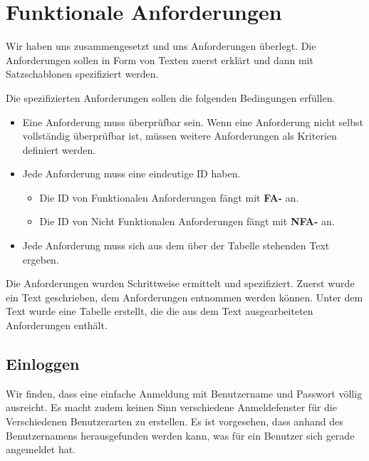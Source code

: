 
\clearpage

\section{Funktionale Anforderungen}
Wir haben uns zusammengesetzt und uns Anforderungen überlegt. Die Anforderungen sollen in Form von Texten zuerst erklärt und dann mit Satzschablonen spezifiziert werden. 

\vspace{6pt}

Die spezifizierten Anforderungen sollen die folgenden Bedingungen erfüllen.
\begin{itemize}
	\item Eine Anforderung muss überprüfbar sein. Wenn eine Anforderung nicht selbst vollständig überprüfbar ist, müssen weitere Anforderungen als Kriterien definiert werden.
	\item Jede Anforderung muss eine eindeutige ID haben. 
	\begin{itemize}
		\item Die ID von Funktionalen Anforderungen fängt mit \textbf{FA-} an.
		\item Die ID von Nicht Funktionalen Anforderungen fängt mit \textbf{NFA-} an.
	\end{itemize}
	\item Jede Anforderung muss sich aus dem über der Tabelle stehenden Text ergeben.
\end{itemize}

Die Anforderungen wurden Schrittweise ermittelt und spezifiziert. Zuerst wurde ein Text geschrieben, dem Anforderungen entnommen werden können. Unter dem Text wurde eine Tabelle erstellt, die die aus dem Text ausgearbeiteten Anforderungen enthält.

\newpage

\subsection{Einloggen}
Wir finden, dass eine einfache Anmeldung mit Benutzername und Passwort völlig ausreicht. Es macht zudem keinen Sinn verschiedene Anmeldefenster für die Verschiedenen Benutzerarten zu erstellen. Es ist vorgesehen, dass anhand des Benutzernamens herausgefunden werden kann, was für ein Benutzer sich gerade angemeldet hat.

\vspace{12pt}

